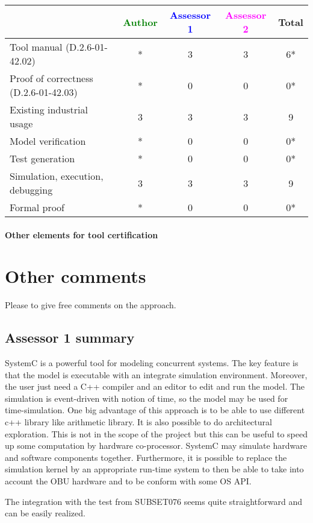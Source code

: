 \begin{tabular}{|l | c | c | c | c|}
\hline
& \textcolor{green}{Author} & \textcolor{blue}{Assessor 1} & \textcolor{magenta}{Assessor 2} & Total \\
\hline
Tool manual (D.2.6-01-42.02) & * &3 &3 & 6* \\
\hline
Proof of correctness (D.2.6-01-42.03) &*  &0 &0 & 0*\\
\hline
Existing industrial usage &3 &3 &3 & 9\\
\hline
Model verification & * &0 &0 & 0*\\
\hline
Test generation & * &0 &0 & 0*\\
\hline
Simulation, execution, debugging &3 &3 &3 & 9 \\
\hline
Formal proof &*  &0 &0 & 0* \\
\hline
\end{tabular}

\paragraph{Other elements for tool certification}

\section{Other comments}
Please to give free comments on the approach.

\subsection{Assessor 1 summary}
SystemC is a powerful tool for modeling concurrent systems. The key
feature is that the model is executable with  an integrate simulation
environment. Moreover, the user just need a C++ compiler and an editor
to edit and run the model. 
The simulation is event-driven  with notion of time, so the model
may be used for time-simulation.
One big advantage of this approach is to be able to use different c++
library like arithmetic library. It is also possible to do
architectural exploration. This is not in the scope of the project but
this can be useful to speed up some computation by hardware
co-processor. SystemC may simulate hardware and software components together.
Furthermore, it is possible to replace the simulation kernel by an
appropriate run-time system  to then be able
to take into account the OBU hardware and to be conform with some OS
API.

The integration with the test from SUBSET076 seems quite straightforward
and can be easily realized. 

